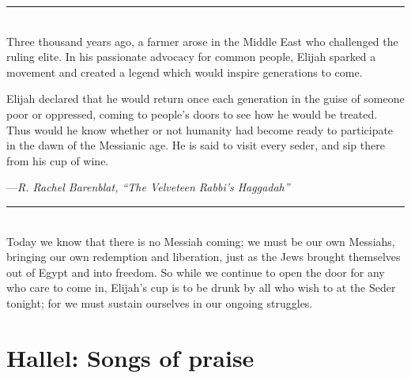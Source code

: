 \documentclass[letter,11pt,openany]{memoir}
\newcommand{\HgSource}[1]{\hfill{\small---\itshape{#1}}}
\newcommand{\HgFill}{
\vfill \hrule 
\vfill}
\newenvironment{HgEnglish}{\strut\\
\noindent}{\vspace{1em}}
\newcommand{\SSrc}{\textsuperscript{\upshape{[S]}}}
\begin{document}
\HgFill
\begin{HgEnglish}
	Three thousand years ago, a farmer arose in the Middle East who challenged the ruling elite. In his passionate advocacy for common people, Elijah sparked a movement and created a legend which would inspire generations to come.
	
	Elijah declared that he would return once each generation in the guise of someone poor or oppressed, coming to people's doors to see how he would be treated. Thus would he know whether or not humanity had become ready to participate in the dawn of the Messianic age. He is said to visit every seder, and sip there from his cup of wine.
	
	\HgSource{R. Rachel Barenblat, ``The Velveteen Rabbi's Haggadah''} 
\end{HgEnglish}

\HgFill
\begin{HgEnglish}
	Today we know that there is no Messiah coming; we must be our own Messiahs, bringing our own redemption and liberation, just as the Jews brought themselves out of Egypt and into freedom. So while we continue to open the door for any who care to come in, Elijah’s cup is to be drunk by all who wish to at the Seder tonight; for we must sustain ourselves in our ongoing struggles. \SSrc 
\end{HgEnglish}

\chapter*{Hallel: Songs of praise}
\end{document}
